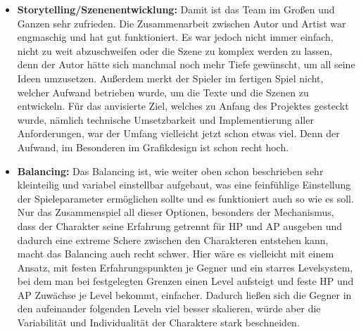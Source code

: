 \begin{itemize}
    \item \textbf{Storytelling/Szenenentwicklung:} Damit ist das Team im Großen und Ganzen sehr zufrieden. Die Zusammenarbeit zwischen Autor und Artist war engmaschig und hat gut funktioniert. Es war jedoch nicht immer einfach, nicht zu weit abzuschweifen oder die Szene zu komplex werden zu lassen, denn der Autor hätte sich manchmal noch mehr Tiefe gewünscht, um all seine Ideen umzusetzen. Außerdem merkt der Spieler im fertigen Spiel nicht, welcher Aufwand betrieben wurde, um die Texte und die Szenen zu entwickeln. Für das anvisierte Ziel, welches zu Anfang des Projektes gesteckt wurde, nämlich technische Umsetzbarkeit und Implementierung aller Anforderungen, war der Umfang vielleicht jetzt schon etwas viel. Denn der Aufwand, im Besonderen im Grafikdesign ist schon recht hoch.

    \item \textbf{Balancing:} Das Balancing ist, wie weiter oben schon beschrieben sehr kleinteilig und variabel einstellbar aufgebaut, was eine feinfühlige Einstellung der Spieleparameter ermöglichen sollte und es funktioniert auch so wie es soll. Nur das Zusammenspiel all dieser Optionen, besonders der Mechanismus, dass der Charakter seine Erfahrung getrennt für HP und AP ausgeben und dadurch eine extreme Schere zwischen den Charakteren entstehen kann, macht das Balancing auch recht schwer. Hier wäre es vielleicht mit einem Ansatz, mit festen Erfahrungspunkten je Gegner und ein starres Levelsystem, bei dem man bei festgelegten Grenzen einen Level aufsteigt und feste HP und AP Zuwächse je Level bekommt, einfacher. Dadurch ließen sich die Gegner in den aufeinander folgenden Leveln viel besser skalieren, würde aber die Variabilität und Individualität der Charaktere stark beschneiden.

\end{itemize}

